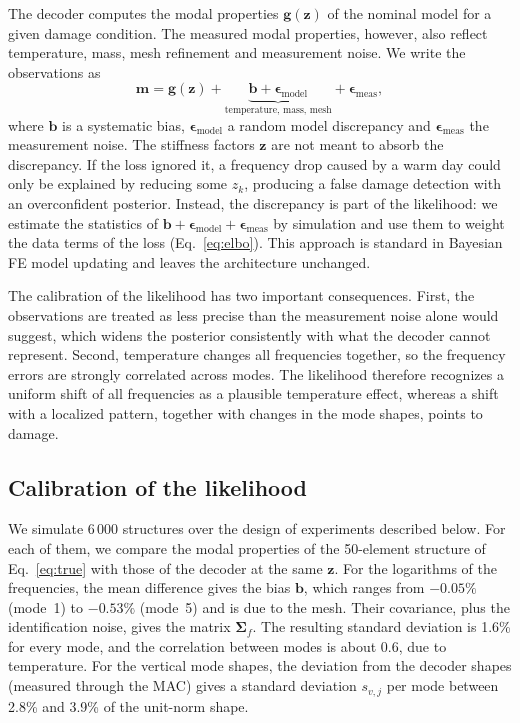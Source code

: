 \documentclass[11pt]{article}
\newcommand{\m}{\mathbf{m}}
\newcommand{\z}{\mathbf{z}}
\begin{document}
The decoder computes the modal properties $\mathbf{g}(\z)$ of the nominal model for a given damage condition. The
measured modal properties, however, also reflect temperature, mass, mesh refinement and measurement noise. We write
the observations as
\begin{equation}
\m = \mathbf{g}(\z) + \underbrace{\mathbf{b} + \bm\epsilon_{\mathrm{model}}}_{\text{temperature, mass, mesh}}
     + \bm\epsilon_{\mathrm{meas}} ,
\label{eq:discrepancy}
\end{equation}
where $\mathbf{b}$ is a systematic bias, $\bm\epsilon_{\mathrm{model}}$ a random model discrepancy and
$\bm\epsilon_{\mathrm{meas}}$ the measurement noise. The stiffness factors $\z$ are not meant to absorb the
discrepancy. If the loss ignored it, a frequency drop caused by a warm day could only be explained by reducing some
$z_k$, producing a false damage detection with an overconfident posterior. Instead, the discrepancy is part of the
likelihood: we estimate the statistics of $\mathbf{b}+\bm\epsilon_{\mathrm{model}}+\bm\epsilon_{\mathrm{meas}}$ by
simulation and use them to weight the data terms of the loss (Eq.~\ref{eq:elbo}). This approach is standard in
Bayesian FE model updating and leaves the architecture unchanged.

The calibration of the likelihood has two important consequences. First, the observations are treated as less
precise than the measurement noise alone would suggest, which widens the posterior consistently with what the decoder
cannot represent. Second, temperature changes all frequencies together, so the frequency errors are strongly
correlated across modes. The likelihood therefore recognizes a uniform shift of all frequencies as a plausible
temperature effect, whereas a shift with a localized pattern, together with changes in the mode shapes, points to
damage.

\subsection{Calibration of the likelihood}

We simulate 6\,000 structures over the design of experiments described below. For each of them, we compare the modal
properties of the 50-element structure of Eq.~\eqref{eq:true} with those of the decoder at the same $\z$. For the
logarithms of the frequencies, the mean difference gives the bias $\mathbf{b}$, which ranges from $-0.05\%$ (mode~1)
to $-0.53\%$ (mode~5) and is due to the mesh. Their covariance, plus the identification noise, gives the matrix
$\bm\Sigma_f$. The resulting standard deviation is 1.6\% for every mode, and the correlation between modes is about
0.6, due to temperature. For the vertical mode shapes, the deviation from the decoder shapes (measured through the
MAC) gives a standard deviation $s_{v,j}$ per mode between 2.8\% and 3.9\% of the unit-norm shape.
\end{document}
